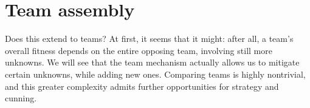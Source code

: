\section{Team assembly}
Does this extend to teams?
At first, it seems that it might: after all, a team's overall fitness
 depends on the entire opposing team, involving still more unknowns.
We will see that the team mechanism actually allows us to mitigate certain
 unknowns, while adding new ones.
Comparing teams is highly nontrivial, and this greater complexity admits
 further opportunities for strategy and cunning.

